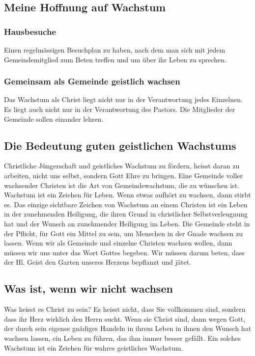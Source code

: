 \documentclass{../../inc/mybib}
\begin{document}
\subsection{Meine Hoffnung auf Wachstum}
\subsubsection{Hausbesuche}
Einen regelmässigen Besuchplan zu haben, nach dem man sich mit jedem Gemeindemitglied zum Beten treffen und um über ihr Leben zu sprechen.
\subsubsection{Gemeinsam als Gemeinde geistlich wachsen}
Das Wachstum als Christ liegt nicht nur in der Verantwortung jedes Einzelnen. Es liegt auch nicht nur in der Verantwortung des Pastors. Die Mitglieder der Gemeinde sollen einander lehren.
\subsection{Die Bedeutung guten geistlichen Wachstums}
Christliche Jüngerschaft und geistliches Wachstum zu fördern, heisst daran zu arbeiten, nicht uns selbst, sondern Gott Ehre zu bringen. Eine Gemeinde voller wachsender Christen ist die Art von Gemeindewachstum, die zu wünschen ist. Wachstum ist ein Zeichen für Leben. Wenn etwas aufhört zu wachsen, dann stirbt es. Das einzige sichtbare Zeichen von Wachstum an einem Christen ist ein Leben in der zunehmenden Heiligung, die ihren Grund in christlicher Selbstverleugnung hat und der Wunsch an zunehmender Heiligung im Leben. Die Gemeinde steht in der Pflicht, für Gott ein Mittel zu sein, um Menschen in der Gnade wachsen zu lassen. Wenn wir als Gemeinde und einzelne Christen wachsen wollen, dann müssen wir uns unter das Wort Gottes begeben. Wir müssen darum beten, dass der Hl. Geist den Garten unseres Herzens bepflanzt und jätet.
\subsection{Was ist, wenn wir nicht wachsen}
Was heisst es Christ zu sein? Es heisst nicht, dass Sie vollkommen sind, sondern dass ihr Herz wirklich den Herrn sucht. Wenn sie Christ sind, dann wegen Gott, der durch sein eigenes gnädiges Handeln in ihrem Leben in ihnen den Wunsch hat wachsen lassen, ein Leben zu führen, das ihm immer besser gefällt. Ein solches Wachstum ist ein Zeichen für wahres geistliches Wachstum.
\end{document}
